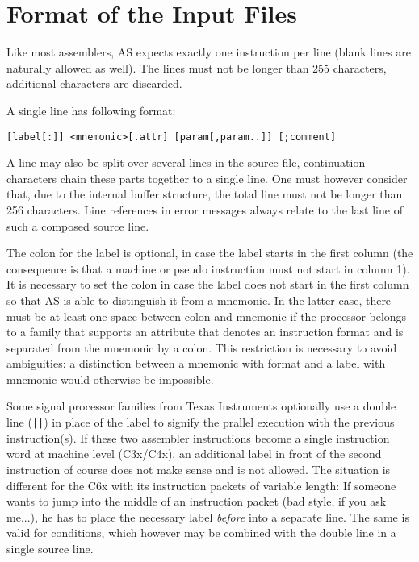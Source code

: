\documentclass[12pt,twoside]{report}
\begin{document}
\section{Format of the Input Files}
\label{AttrTypes}

Like most assemblers, AS expects exactly one instruction per line
(blank lines are naturally allowed as well).  The lines must not be
longer than 255 characters, additional characters are discarded.

A single line has following format:
\begin{verbatim}
[label[:]] <mnemonic>[.attr] [param[,param..]] [;comment]
\end{verbatim}
A line may also be split over several lines in the source file,
continuation characters chain these parts together to a single line.  One
must however consider that, due to the internal buffer structure, the
total line must not be longer than 256 characters.  Line references in
error messages always relate to the last line of such a composed source
line.
\par
The colon for the label is optional, in case the label starts in the
first column (the consequence is that a machine or pseudo
instruction must not start in column 1).  It is necessary to set the
colon in case the label does not start in the first column so that AS
is able to distinguish it from a mnemonic.  In the latter case, there
must be at least one space between colon and mnemonic if the processor
belongs to a family that supports an attribute that denotes an
instruction format and is separated from the mnemonic by a colon.  This
restriction is necessary to avoid ambiguities: a distinction between a
mnemonic with format and a label with mnemonic would otherwise be
impossible.

Some signal processor families from Texas Instruments optionally use
a double line (\verb!||!) in place of the label to signify the
prallel execution with the previous instruction(s).  If these two
assembler instructions become a single instruction word at machine
level (C3x/C4x), an additional label in front of the second
instruction of course does not make sense and is not allowed.  The
situation is different for the C6x with its instruction packets of
variable length: If someone wants to jump into the middle of an
instruction packet (bad style, if you ask me...), he has to place the
necessary label {\em before} into a separate line.  The same is valid
for conditions, which however may be combined with the double line in
a single source line.
\end{document}
